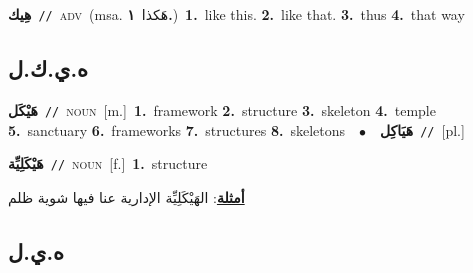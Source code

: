 \documentclass[10pt,a4paper,twoside]{article} %
\begin{document}
\begin{multicols}{2}
{\setlength\topsep{0pt}\textbf{\foreignlanguage{arabic}{هِيك}}\ {\color{gray}\texttt{//}\color{black}}\ \textsc{adv}\ \color{gray}(msa. \foreignlanguage{arabic}{هَكذا}~\foreignlanguage{arabic}{\textbf{١.}})\color{black}\ \textbf{1.}~like this.  \textbf{2.}~like that.  \textbf{3.}~thus  \textbf{4.}~that way\ } \vspace{2mm}

\vspace{-3mm}
\subsection*{\color{blue}\foreignlanguage{arabic}{ه.ي.ك.ل}\color{blue}{}} 

{\setlength\topsep{0pt}\textbf{\foreignlanguage{arabic}{هَيْكَل}}\ {\color{gray}\texttt{//}\color{black}}\ \textsc{noun}\ [m.]\ \textbf{1.}~framework  \textbf{2.}~structure  \textbf{3.}~skeleton  \textbf{4.}~temple  \textbf{5.}~sanctuary  \textbf{6.}~frameworks  \textbf{7.}~structures  \textbf{8.}~skeletons\ \ $\bullet$\ \ \setlength\topsep{0pt}\textbf{\foreignlanguage{arabic}{هَيَاكِل}}\ {\color{gray}\texttt{//}\color{black}}\ [pl.]\ } \vspace{2mm}

{\setlength\topsep{0pt}\textbf{\foreignlanguage{arabic}{هَيْكَلِيِّة}}\ {\color{gray}\texttt{//}\color{black}}\ \textsc{noun}\ [f.]\ \textbf{1.}~structure\  \begin{flushright}\color{gray}\foreignlanguage{arabic}{\textbf{\underline{\foreignlanguage{arabic}{أمثلة}}}: الهَيْكَلِيِّة الإدارية عنا فيها شوية ظلم}\end{flushright}\color{black}} \vspace{2mm}

\vspace{-3mm}
\subsection*{\color{blue}\foreignlanguage{arabic}{ه.ي.ل}\color{blue}{}} 


\end{multicols}
\end{document}
